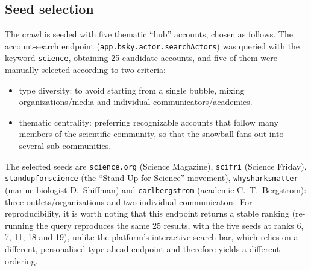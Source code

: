 \subsection{Seed selection}
The crawl is seeded with five thematic ``hub'' accounts, chosen as follows. The account-search endpoint (\texttt{app.bsky.\allowbreak actor.\allowbreak searchActors}) was queried with the keyword \texttt{science}, obtaining 25 candidate accounts, and five of them were manually selected according to two criteria:
\begin{itemize}
    \item type diversity: to avoid starting from a single bubble, mixing organizations/media and individual communicators/aca\-demics.
    \item thematic centrality: preferring recognizable accounts that follow many members of the scientific community, so that the snowball fans out into several sub-communities. 
    \end{itemize}
    The selected seeds are \texttt{science.org} (Science Magazine), \texttt{scifri} (Science Friday), \texttt{standupforscience} (the ``Stand Up for Science'' movement), \texttt{whysharksmatter} (marine biologist D.~Shiffman) and \texttt{carlbergstrom} (academic C.~T.~Bergstrom): three outlets/organizations and two individual communicators. For reproducibility, it is worth noting that this endpoint returns a stable ranking (re-running the query reproduces the same 25 results, with the five seeds at ranks 6, 7, 11, 18 and 19), unlike the platform's interactive search bar, which relies on a different, personalised type-ahead endpoint and therefore yields a different ordering.
    


